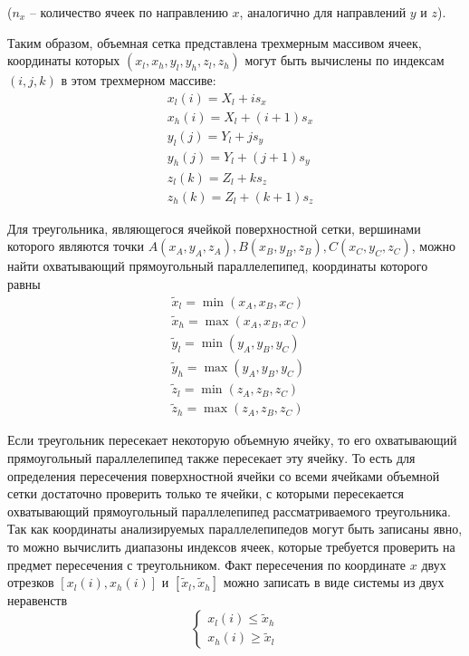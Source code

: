($n_x$ -- количество ячеек по направлению $x$, аналогично для направлений $y$ и $z$).

Таким образом, объемная сетка представлена трехмерным массивом ячеек, координаты которых $(x_l, x_h, y_l, y_h, z_l, z_h)$ могут быть вычислены по индексам $(i, j, k)$ в этом трехмерном массиве:
\begin{equation}
	\begin{aligned}
		& x_l(i) = X_l + i s_x \\
		& x_h(i) = X_l + (i + 1) s_x \\
		& y_l(j) = Y_l + j s_y \\
		& y_h(j) = Y_l + (j + 1) s_y \\
		& z_l(k) = Z_l + k s_z \\
		& z_h(k) = Z_l + (k + 1) s_z		
	\end{aligned}
\end{equation}

Для треугольника, являющегося ячейкой поверхностной сетки, вершинами которого являются точки $A(x_A, y_A, z_A), B(x_B, y_B, z_B), C(x_C, y_C, z_C)$, можно найти охватывающий прямоугольный параллелепипед, координаты которого равны
\begin{equation}
	\begin{aligned}
		& \tilde{x}_l = \min(x_A, x_B, x_C) \\
		& \tilde{x}_h = \max(x_A, x_B, x_C) \\
		& \tilde{y}_l = \min(y_A, y_B, y_C) \\
		& \tilde{y}_h = \max(y_A, y_B, y_C) \\
		& \tilde{z}_l = \min(z_A, z_B, z_C) \\
		& \tilde{z}_h = \max(z_A, z_B, z_C)
	\end{aligned}
\end{equation}

Если треугольник пересекает некоторую объемную ячейку, то его охватывающий прямоугольный параллелепипед также пересекает эту ячейку.
То есть для определения пересечения поверхностной ячейки со всеми ячейками объемной сетки достаточно проверить только те ячейки, с которыми пересекается охватывающий прямоугольный параллелепипед рассматриваемого треугольника.
Так как координаты анализируемых параллелепипедов могут быть записаны явно, то можно вычислить диапазоны индексов ячеек, которые требуется проверить на предмет пересечения с треугольником.
Факт пересечения по координате $x$ двух отрезков $[x_l(i), x_h(i)]$ и $[\tilde{x}_l, \tilde{x}_h]$ можно записать в виде системы из двух неравенств
\begin{equation}\label{eqn:text_4_mesh_intersect_eq2}
	\left\{
		\begin{aligned}
			x_l(i) \le \tilde{x}_h \\
			x_h(i) \ge \tilde{x}_l
		\end{aligned}
	\right.
\end{equation}

